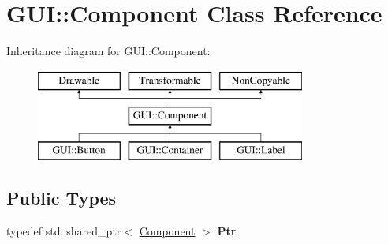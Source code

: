 \hypertarget{class_g_u_i_1_1_component}{}\section{G\+U\+I\+:\+:Component Class Reference}
\label{class_g_u_i_1_1_component}
Inheritance diagram for G\+U\+I\+:\+:Component\+:\begin{figure}[H]
\begin{center}
\leavevmode
\includegraphics[height=3.000000cm]{class_g_u_i_1_1_component}
\end{center}
\end{figure}
\subsection*{Public Types}
\begin{DoxyCompactItemize}
\item 
\hypertarget{class_g_u_i_1_1_component_aa51eb17541f4cbe71b60cf7e1e16f32b}{}typedef std\+::shared\+\_\+ptr$<$ \hyperlink{class_g_u_i_1_1_component}{Component} $>$ {\bfseries Ptr}\label{class_g_u_i_1_1_component_aa51eb17541f4cbe71b60cf7e1e16f32b}

\end{DoxyCompactItemize}
